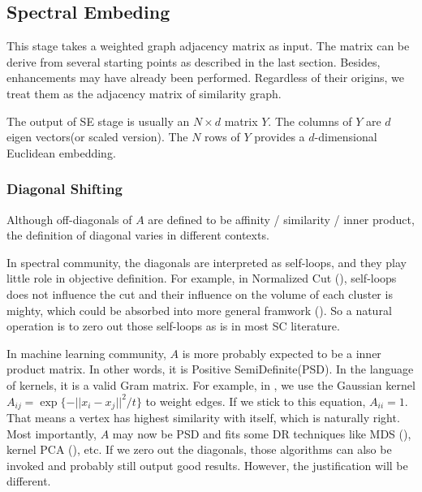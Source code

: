 
\subsection{Spectral Embeding}
\label{sec:se}

This stage takes a weighted graph adjacency matrix as input. 
The matrix can be derive from several starting points as 
described in the last section. Besides, enhancements may 
have already been performed. Regardless of their origins, 
we treat them as the adjacency matrix of similarity graph. 

The output of SE stage is usually an $ N \times d $ matrix $ Y $.
The columns of $ Y $ are $ d $ eigen vectors(or scaled version). 
The $ N $ rows of $ Y $ provides a $ d $-dimensional Euclidean 
embedding. 

\subsubsection{Diagonal Shifting}
\label{sec:diags}

Although off-diagonals of $A$ are defined to be affinity / similarity / 
inner product, the definition of diagonal varies in different contexts. 

In spectral community, the diagonals are interpreted as self-loops, 
and they play little role in objective definition. For example, 
in Normalized Cut (\rsec{\ref{sec:ncut}}), self-loops does not 
influence the cut and their influence on the volume of each cluster 
is mighty, which could be absorbed into more general framwork
(\rsec{\ref{sec:wcut}}). So a natural operation is to zero out
those self-loops as is in most SC literature. 

In machine learning community, $A$ is more probably expected to be
a inner product matrix. In other words, it is Positive SemiDefinite(PSD). 
In the language of kernels, it is a valid Gram matrix. For example, 
in \rsec{\ref{sec:metric_hdd}}, we use the Gaussian kernel
$A_{ij} = \exp\{-||x_i-x_j||^2/t\}$ to weight edges. If we stick to 
this equation, $A_{ii} = 1$. That means a vertex has highest similarity 
with itself, which is naturally right. Most importantly, 
$A$ may now be PSD and fits some DR techniques like MDS
(\rsec{\ref{sec:mds}}), kernel PCA (\rsec{\ref{sec:kpca}}), etc. 
If we zero out the diagonals, those algorithms can also be invoked 
and probably still output good results. However, the justification 
will be different. 

